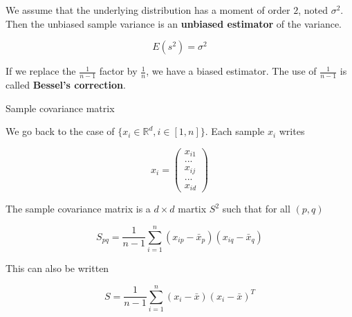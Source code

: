 \documentclass[
10pt, %
a4paper, %
oneside, %
headinclude,footinclude, %
BCOR5mm, %
]{scrartcl}
\begin{document}
\begin{remark}
    
    We assume that the underlying distribution has a moment of order $2$, noted $\sigma^2$. Then the unbiased sample variance is an \textbf{{unbiased estimator}} of the variance.

    \begin{equation*}
	E(s^2)=\sigma^2
    \end{equation*}

    If we replace the $ \frac{1}{n-1} $ factor by $ \frac{1}{n} $, we have a biased estimator. The use of $ \frac{1}{n-1} $ is called \textbf{{Bessel's correction}}. 
\end{remark}

\begin{definition}{Sample covariance matrix}

    We go back to the case of $ \{x_i\in \mathbb{R}^d, i\in [1, n]\}$. Each sample $x_i$ writes

\begin{equation*}
    x_i=\begin{pmatrix}
	x_{i1}\\
...\\
	x_{ij}\\
...\\
	x_{id}
\end{pmatrix}
\end{equation*}

    The sample covariance matrix is a $d\times d$ martix $S^2$ such that for all $(p,q)$

    \begin{equation*}
	S_{pq} = \frac{1}{n-1} \sum^{n}_{i=1} (x_{ip}- \bar{x}_p) (x_{iq}- \bar{x}_q) 
    \end{equation*}

    This can also be written

    \begin{equation*}
	S = \frac{1}{n-1} \sum^{n}_{i=1} (x_i- \bar{x})(x_i- \bar{x})^T
    \end{equation*}
\end{definition}
\end{document}
